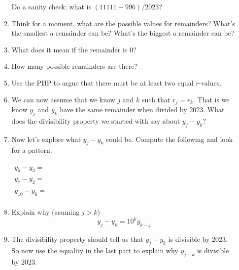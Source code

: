 \documentclass[12pt]{article}
\begin{document}
\begin{enumerate}
\begin{enumerate}
					Do a sanity check: what is $(11111-996)/2023$?
				\item Think for a moment, what are the possible values for remainders?  What's the smallest a remainder can be? What's the biggest a remainder can be?
						\vskip 1in
				\item What does it mean if the remainder is 0?
					\vskip 1in
				\item How many possible remainders are there?
					\vskip 1in
				\item Use the PHP to argue that there must be at least two equal $r$-values.
					\vskip 1in
				\item We can now assume that we know $j$ and $k$ such that $r_j=r_k$.
					That is we know $y_j$ and $y_k$ have the same remainder when divided by 2023.
					What does the divisibility property we started with say about $y_j-y_k$?
					\vskip 1in
				\item Now let's explore what $y_j-y_k$ could be.  Compute the following and look for a pattern: \\\\
					$\begin{array}{l}
						y_5-y_3=\\\\
						y_7-y_2=\\\\
						y_{10}-y_{6}=\\
					\end{array}$
				\item Explain why (asuming $j>k$)
					$$y_j-y_k=10^k y_{k-j}$$
					\vskip 1in
				\item The divisibility property should tell us that $y_j-y_k$ is divisible by 2023. So now use the equality in the last part to explain why $y_{j-k}$ is divisible by $2023$.
			\end{enumerate}
			
			
\end{enumerate}
\end{document}
